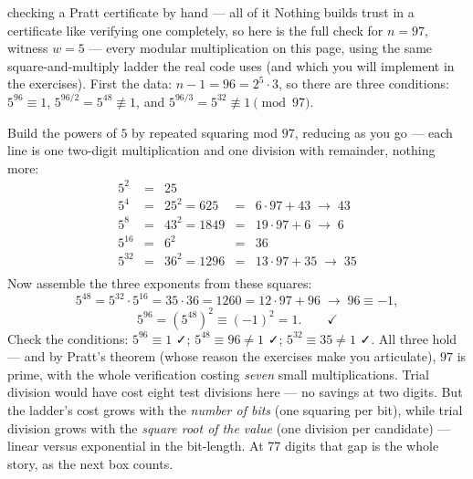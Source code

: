 \begin{worked}{checking a Pratt certificate by hand --- all of it}
Nothing builds trust in a certificate like verifying one completely, so
here is the full check for $n = 97$, witness $w = 5$ --- every modular
multiplication on this page, using the same square-and-multiply ladder
the real code uses (and which you will implement in the exercises).
First the data: $n - 1 = 96 = 2^5 \cdot 3$, so there are three
conditions: $5^{96} \equiv 1$, $5^{96/2} = 5^{48} \not\equiv 1$, and
$5^{96/3} = 5^{32} \not\equiv 1 \pmod{97}$.

Build the powers of $5$ by repeated squaring mod $97$, reducing as you go
--- each line is one two-digit multiplication and one division with
remainder, nothing more:
\[
\begin{array}{lclcl}
5^{2} &=& 25 \\
5^{4} &=& 25^2 = 625 &=& 6\cdot 97 + 43 \;\to\; 43\\
5^{8} &=& 43^2 = 1849 &=& 19\cdot 97 + 6 \;\to\; 6\\
5^{16} &=& 6^2 &=& 36\\
5^{32} &=& 36^2 = 1296 &=& 13\cdot 97 + 35 \;\to\; 35\\
\end{array}
\]
Now assemble the three exponents from these squares:
\[
5^{48} = 5^{32} \cdot 5^{16} = 35 \cdot 36 = 1260 = 12 \cdot 97 + 96
\;\to\; 96 \equiv -1 ,
\]
\[
5^{96} = (5^{48})^2 \equiv (-1)^2 = 1 . \qquad ✓
\]
Check the conditions: $5^{96} \equiv 1$ ✓; $5^{48} \equiv 96 \neq 1$ ✓;
$5^{32} \equiv 35 \neq 1$ ✓. All three hold --- and by Pratt's theorem
(whose reason the exercises make you articulate), $97$ is prime, with the
whole verification costing \emph{seven} small multiplications. Trial
division would have cost eight test divisions here --- no savings at two
digits. But the ladder's cost grows with the \emph{number of bits} (one
squaring per bit), while trial division grows with the \emph{square root
of the value} (one division per candidate) --- linear versus exponential
in the bit-length. At 77 digits that gap is the whole story, as the next
box counts.
\end{worked}

